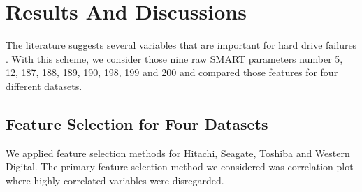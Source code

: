 \documentclass[conference]{IEEEtran}
\begin{document}
\section{Results And Discussions}

The literature suggests several variables that are important for hard drive failures \cite{b13}. With this scheme, we consider those nine raw SMART parameters number 5, 12, 187, 188, 189, 190, 198, 199 and 200 and compared those features for four different datasets.

\subsection{Feature Selection for Four Datasets}
We applied feature selection methods for Hitachi, Seagate, Toshiba and Western Digital. The primary feature selection method we considered was correlation plot where highly correlated variables were disregarded. 
\\
\end{document}
